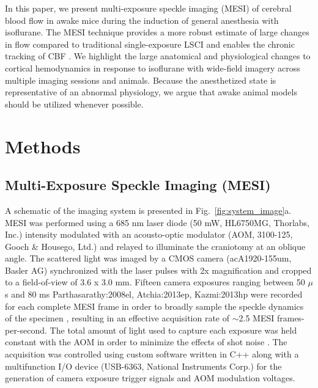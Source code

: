 \documentclass[12pt]{spieman}
\begin{document}
\begin{spacing}{2}
In this paper, we present multi-exposure speckle imaging (MESI) of cerebral blood flow in awake mice during the induction of general anesthesia with isoflurane. The MESI technique \cite{Parthasarathy:2008el} provides a more robust estimate of large changes in flow compared to traditional single-exposure LSCI \cite{Parthasarathy:2010vo} and enables the chronic tracking of CBF \cite{Kazmi:2013hp}. We highlight the large anatomical and physiological changes to cortical hemodynamics in response to isoflurane with wide-field imagery across multiple imaging sessions and animals. Because the anesthetized state is representative of an abnormal physiology, we argue that awake animal models should be utilized whenever possible.


\section{Methods}
\label{sect:methods}

\subsection{Multi-Exposure Speckle Imaging (MESI)}
A schematic of the imaging system is presented in Fig.~\ref{fig:system_image}a. MESI was performed using a 685 nm laser diode (50 mW, HL6750MG, Thorlabs, Inc.) intensity modulated with an acousto-optic modulator (AOM, 3100-125, Gooch \& Housego, Ltd.) and relayed to illuminate the craniotomy at an oblique angle. The scattered light was imaged by a CMOS camera (acA1920-155um, Basler AG) synchronized with the laser pulses with 2x magnification and cropped to a field-of-view of 3.6 x 3.0 mm. Fifteen camera exposures ranging between 50 $\mu$s and 80 ms {Parthasarathy:2008el, Atchia:2013ep, Kazmi:2013hp} were recorded for each complete MESI frame in order to broadly sample the speckle dynamics of the specimen \cite{Kazmi:2014go}, resulting in an effective acquisition rate of $\sim$2.5 MESI frames-per-second. The total amount of light used to capture each exposure was held constant with the AOM in order to minimize the effects of shot noise \cite{Parthasarathy:2008el}. The acquisition was controlled using custom software written in C++ along with a multifunction I/O device (USB-6363, National Instruments Corp.) for the generation of camera exposure trigger signals and AOM modulation voltages.


\end{spacing}
\end{document}

